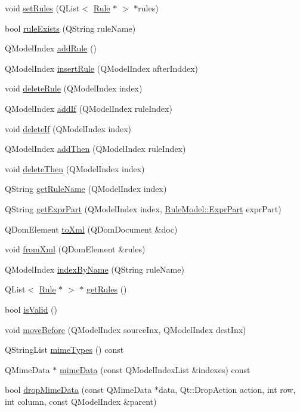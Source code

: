 \begin{DoxyCompactItemize}
\item 
void \hyperlink{class_rule_model_a0d600988571bbb79344439763c03f13d}{setRules} (QList$<$ \hyperlink{class_rule}{Rule} $\ast$ $>$ $\ast$rules)
\item 
bool \hyperlink{class_rule_model_a33b17156eeac9d685dbaf5835905ec33}{ruleExists} (QString ruleName)
\item 
QModelIndex \hyperlink{class_rule_model_aac2bf5aeb8aa45c2633ea98cf7ce5a42}{addRule} ()
\item 
QModelIndex \hyperlink{class_rule_model_a37c31c0ea2c63f0a41f6ceea25cd67f7}{insertRule} (QModelIndex afterInddex)
\item 
void \hyperlink{class_rule_model_a561002ec39461adcf932717a6dd299da}{deleteRule} (QModelIndex index)
\item 
QModelIndex \hyperlink{class_rule_model_ada9f0f96da069f0e19e7cf43188aa7b4}{addIf} (QModelIndex ruleIndex)
\item 
void \hyperlink{class_rule_model_acdf78d44f8e6a960295624a5885a6d33}{deleteIf} (QModelIndex index)
\item 
QModelIndex \hyperlink{class_rule_model_a3e1fa18cfb0fdbf23b4854c19b3f4532}{addThen} (QModelIndex ruleIndex)
\item 
void \hyperlink{class_rule_model_a3141590409f36b6aff172adfe2ea5395}{deleteThen} (QModelIndex index)
\item 
QString \hyperlink{class_rule_model_ae1ff29d7064baac4d1513b5ecde12577}{getRuleName} (QModelIndex index)
\item 
QString \hyperlink{class_rule_model_a50bf4e7ad8aa7f82f1ad730a549c42c9}{getExprPart} (QModelIndex index, \hyperlink{class_rule_model_a1010ef4729cc70469ab2a51416b32716}{RuleModel::ExprPart} exprPart)
\item 
QDomElement \hyperlink{class_rule_model_a9048ce06933aefd4a1353228db069c61}{toXml} (QDomDocument \&doc)
\item 
void \hyperlink{class_rule_model_a63f56e19be4afdf322958837193b7891}{fromXml} (QDomElement \&rules)
\item 
QModelIndex \hyperlink{class_rule_model_a5064e0aecac4a12fea106353e277525c}{indexByName} (QString ruleName)
\item 
QList$<$ \hyperlink{class_rule}{Rule} $\ast$ $>$ $\ast$ \hyperlink{class_rule_model_a86b641c89940ecb1a422e624029ac55d}{getRules} ()
\item 
bool \hyperlink{class_rule_model_afa7c3b765c852ada4273d58c73fcf2dd}{isValid} ()
\item 
void \hyperlink{class_rule_model_a73b8d90c8ad39fde6430fd521c47d67f}{moveBefore} (QModelIndex sourceInx, QModelIndex destInx)
\item 
QStringList \hyperlink{class_rule_model_a64f42e943ee15f0bab3629b77e75cfbc}{mimeTypes} () const 
\item 
QMimeData $\ast$ \hyperlink{class_rule_model_a7f84f1c0ad80ad802d27335b9c5105db}{mimeData} (const QModelIndexList \&indexes) const 
\item 
bool \hyperlink{class_rule_model_aef085bed1b61272c4c6fa2e9a827a3ff}{dropMimeData} (const QMimeData $\ast$data, Qt::DropAction action, int row, int column, const QModelIndex \&parent)
\end{DoxyCompactItemize}


